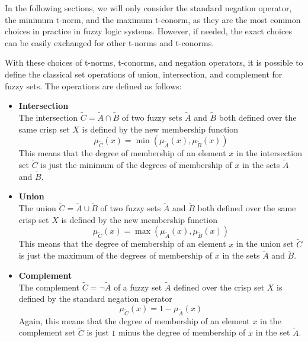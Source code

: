 In the following sections, we will only consider the standard negation operator, the minimum t-norm, and the maximum t-conorm, as they are the most common choices in practice in fuzzy logic systems. However, if needed, the exact choices can be easily exchanged for other t-norms and t-conorms.


With these choices of t-norms, t-conorms, and negation operators, it is possible to define the classical set operations of union, intersection, and complement for fuzzy sets. The operations are defined as follows:


\begin{itemize}

      \item \textbf{Intersection} \\
            The intersection $\tilde{C} = \tilde{A} \cap \tilde{B}$ of two fuzzy sets $\tilde{A}$ and $\tilde{B}$ both defined over the same crisp set $X$ is defined by the new membership function
            \begin{equation}
                  \mu_{\tilde{C}}(x) = \min(\mu_{\tilde{A}}(x), \mu_{\tilde{B}}(x))
            \end{equation}
            This means that the degree of membership of an element $x$ in the intersection set $\tilde{C}$ is just the minimum of the degrees of membership of $x$ in the sets $\tilde{A}$ and $\tilde{B}$.
      \item \textbf{Union} \\
            The union $\tilde{C} = \tilde{A} \cup \tilde{B}$ of two fuzzy sets $\tilde{A}$ and $\tilde{B}$ both defined over the same crisp set $X$ is defined by the new membership function
            \begin{equation}
                  \mu_{\tilde{C}}(x) = \max(\mu_{\tilde{A}}(x), \mu_{\tilde{B}}(x))
            \end{equation}
            This means that the degree of membership of an element $x$ in the union set $\tilde{C}$ is just the maximum of the degrees of membership of $x$ in the sets $\tilde{A}$ and $\tilde{B}$.

      \item \textbf{Complement} \\
            The complement $\tilde{C} = \neg \tilde{A}$ of a fuzzy set $\tilde{A}$ defined over the crisp set $X$ is defined by the standard negation operator
            \begin{equation}
                  \mu_{\tilde{C}}(x) = 1 - \mu_{\tilde{A}}(x)
            \end{equation}
            Again, this means that the degree of membership of an element $x$ in the complement set $\tilde{C}$ is just $1$ minus the degree of membership of $x$ in the set $\tilde{A}$.
\end{itemize}

